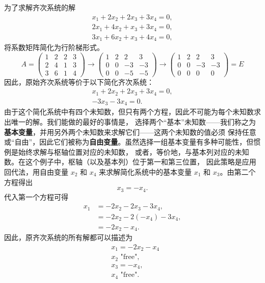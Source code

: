 为了求解齐次系统的解
\[
\begin{array}{cols}
    x_1 + 2x_2 + 2x_3 + 3x_4 = 0, \\
    2x_1 + 4x_2 + x_3 + 3x_4 = 0, \\
    3x_1 + 6x_2 + x_3 + 4x_4 = 0,
\end{array}
\]
将系数矩阵简化为行阶梯形式。
\[
A = 
\left(\begin{array}{cccc}
1 & 2 & 2 & 3 \\
2 & 4 & 1 & 3 \\
3 & 6 & 1 & 4
\end{array}\right)\to
\left(\begin{array}{cccc}
1 & 2 & 2 & 3 \\
0 & 0 & -3 & -3 \\
0 & 0 & -5 & -5
\end{array}\right)\to
\left(\begin{array}{cccc}
1 & 2 & 2 & 3 \\
0 & 0 & -3 & -3 \\
0 & 0 & 0 & 0
\end{array}\right)
= E
\]
因此，原始齐次系统等价于以下简化齐次系统：
\[
\begin{array}{cols}
    x_1 + 2x_2 + 2x_3 + 3x_4 = 0, \\
    -3x_3 - 3x_4 = 0.
\end{array}
\]
由于这个简化系统中有四个未知数，但只有两个方程，因此不可能为每个未知数求出唯一的解。我们能做的最好的事情是，
选择两个“基本”未知数——我们称之为\textbf{基本变量}，并用另外两个未知数来求解它们——这两个未知数的值必须
保持任意或“自由”，因此它们被称为\textbf{自由变量}。虽然选择一组基本变量有多种可能性，但惯例是始终求解与枢轴位置对应的未知数，
或者，等价地，与基本列对应的未知数。在这个例子中，枢轴（以及基本列）位于第一和第三位置，
因此策略是应用回代法，用自由变量 \(x_2\) 和 \(x_4\) 来求解简化系统中的基本变量 \(x_1\) 和 \(x_3\)。由第二个方程得出
\[
x_3 = -x_4.
\]
代入第一个方程可得
\[
\begin{align}
x_1 &= -2x_2 -2x_3 - 3x_4, \\
&= -2x_2 - 2(-x_4) - 3x_4, \\
&= -2x_2 - x_4.
\end{align}
\]
因此，原齐次系统的所有解都可以描述为
\[
\begin{align}
    &x_1 = -2x_2 - x_4 \\
    &x_2 \text{ "free"}, \\
    &x_3 = -x_4, \\
    &x_4 \text{ "free"}.
\end{align}
\]
